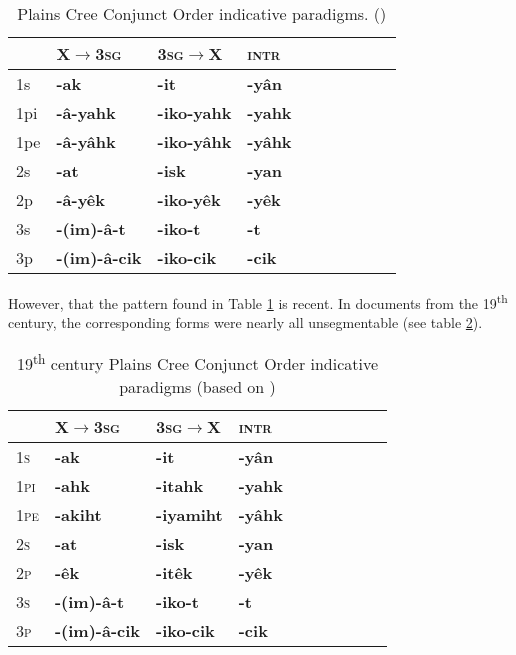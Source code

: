 \documentclass{article}
\newcommand{\ipa}[1]{{\phon\textbf{#1}}}
\newcommand{\bleu}[1]{\cellcolor{blue!20}\textbf{#1}}
\begin{document}
\begin{table}[H]
\caption{Plains Cree Conjunct Order indicative paradigms.  (\citealt{wolfart96sketch})}
\label{tab:cree.conj} \centering
\begin{tabular}{llllllllll}
  \bottomrule
  &	X$\rightarrow$\textsc{3sg} &	\textsc{3sg}$\rightarrow$X &	\textsc{intr} &	\\	
  \midrule
  1s &	\ipa{-ak} \bleu{} &	\ipa{-it} \bleu{}&	\ipa{-yân} &	\\
1pi &	\ipa{-â-yahk} &	\ipa{-iko-yahk} &	\ipa{-yahk} &	\\
1pe &	\ipa{-â-yâhk} &	\ipa{-iko-yâhk} &	\ipa{-yâhk} &	\\
2s &	\ipa{-at} \bleu{}&	\ipa{-isk} \bleu{}&	\ipa{-yan} &	\\
2p &	\ipa{-â-yêk} &	\ipa{-iko-yêk} &	\ipa{-yêk} &	\\
3s &	\ipa{-(im)-â-t} &	\ipa{-iko-t} &	\ipa{-t} &	\\
3p &	\ipa{-(im)-â-cik} &	\ipa{-iko-cik} &	\ipa{-cik} &	\\
    \bottomrule
\end{tabular}
\end{table}

However, that  the pattern found in Table   \ref{tab:cree.conj} is recent. In documents from the 19\textsuperscript{th} century, the corresponding forms were nearly all unsegmentable (see table \ref{tab:creedia.conj}).

\begin{table}[H]
\caption{19\textsuperscript{th} century Plains Cree Conjunct Order indicative paradigms (based on \citealt{dahlstrom89change})}
\label{tab:creedia.conj} \centering
\begin{tabular}{llllllllll}
  \bottomrule
  &	X$\rightarrow$\textsc{3sg} &	\textsc{3sg}$\rightarrow$X &	\textsc{intr} &	\\	
  \midrule
\textsc{1s} &	\ipa{-ak} &	\ipa{-it} &	\ipa{-yân} &	\\
\textsc{1pi} &	\ipa{-ahk} &	\ipa{-itahk} &	\ipa{-yahk} &	\\
\textsc{1pe} &	\ipa{-akiht} &	\ipa{-iyamiht} &	\ipa{-yâhk} &	\\
\textsc{2s} &	\ipa{-at} &	\ipa{-isk} &	\ipa{-yan} &	\\
\textsc{2p} &	\ipa{-êk} &	\ipa{-itêk} &	\ipa{-yêk} &	\\
\textsc{3s} &	\ipa{-(im)-â-t} &	\ipa{-iko-t} &	\ipa{-t} &	\\
\textsc{3p} &	\ipa{-(im)-â-cik} &	\ipa{-iko-cik} &	\ipa{-cik} &	\\
  \bottomrule
\end{tabular}
\end{table}
\end{document}
